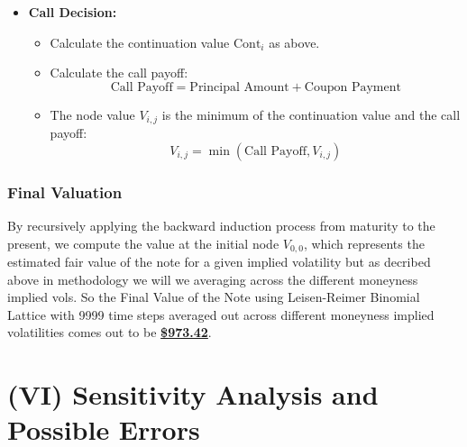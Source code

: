 \documentclass[12pt,a4paper]{article}
\begin{document}
\begin{itemize}
    \item \textbf{Call Decision:}
    \begin{itemize}
        \item Calculate the continuation value \( \text{Cont}_i \) as above.
        \item Calculate the call payoff:
        \[
        \text{Call Payoff} = \text{Principal Amount} + \text{Coupon Payment}
        \]
        \item The node value \( V_{i,j} \) is the minimum of the continuation value and the call payoff:
        \[
        V_{i,j} = \min\left( \text{Call Payoff}, V_{i,j} \right)
        \]
    \end{itemize}
\end{itemize}

\subsubsection*{Final Valuation}

By recursively applying the backward induction process from maturity to the present, we compute the value at the initial node \( V_{0,0} \), which represents the estimated fair value of the note for a given implied volatility but as decribed above in methodology we will we averaging across the different moneyness implied vols. So the Final Value of the Note using Leisen-Reimer Binomial Lattice with 9999 time steps averaged out across different moneyness implied volatilities comes out to be  \underline{\textbf{\$973.42}}.

\section*{(VI) Sensitivity Analysis and Possible Errors}
\end{document}
